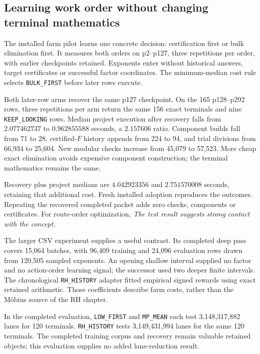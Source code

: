\subsection{Learning work order without changing terminal mathematics}

The installed farm pilot learns one concrete decision:
certification first or bulk elimination first. It measures both
orders on p2--p127, three repetitions per order, with earlier
checkpoints retained. Exponents enter without historical
answers, target certificates or successful factor coordinates.
The minimum-median cost rule selects
\texttt{BULK\_FIRST} before later rows execute.

Both later-row arms recover the same p127 checkpoint. On the
165 p128--p292 rows, three repetitions per arm return the same
156 exact terminals and nine \texttt{KEEP\_LOOKING} rows.
Median project execution after recovery falls from
\(2.077462737\) to \(0.962855588\) seconds, a \(2.157606\)
ratio. Component builds fall from 71 to 28, certified-\(F\)
history appends from 224 to 94, and trial divisions from
66,934 to 25,604. New modular checks increase from 45,079
to 57,523. More cheap exact elimination avoids expensive
component construction; the terminal mathematics remains
the same.

Recovery plus project medians are \(4.042923356\) and
\(2.751570008\) seconds, retaining that additional cost.
Fresh installed adoption reproduces the outcomes. Repeating
the recovered completed packet adds zero checks, components
or certificates. For route-order optimization,
\emph{The test result suggests strong contact with the concept.}

The larger CSV experiment supplies a useful contrast. Its
completed deep pass covers 15,064 batches, with 96,409
training and 24,096 evaluation rows drawn from 120,505
sampled exponents. An opening shallow interval supplied no
factor and no action-order learning signal; the successor
used two deeper finite intervals. The chronological
\texttt{RH\_HISTORY} adapter fitted empirical signed rewards
using exact retained arithmetic. Those coefficients describe
farm costs, rather than the Möbius source of the RH chapter.

In the completed evaluation, \texttt{LOW\_FIRST} and
\texttt{MP\_MEAN} each test 3,148,317,882 lanes for 120
terminals. \texttt{RH\_HISTORY} tests 3,149,431,994 lanes
for the same 120 terminals. The completed training corpus
and recovery remain valuable retained objects; this
evaluation supplies no added lane-reduction result.

